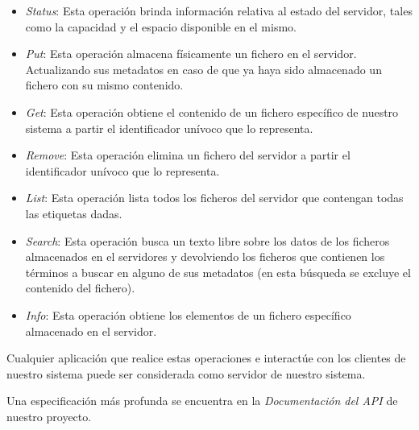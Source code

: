 \documentclass{article}
\begin{document}
\begin{itemize}
  \item \emph{Status}: Esta operación brinda información relativa al estado del
  servidor, tales como la capacidad y el espacio disponible en el mismo.
  \item \emph{Put}: Esta operación almacena físicamente un fichero en el 
  servidor. Actualizando sus metadatos en caso de que ya haya sido almacenado
  un fichero con su mismo contenido.
  \item \emph{Get}: Esta operación obtiene el contenido de un fichero específico
  de nuestro sistema a partir el identificador unívoco que lo representa.
  \item \emph{Remove}: Esta operación elimina un fichero del servidor a partir
  el identificador unívoco que lo representa.
  \item \emph{List}: Esta operación lista todos los ficheros del servidor que
  contengan todas las etiquetas dadas.
  \item \emph{Search}: Esta operación busca un texto libre sobre los datos
  de los ficheros almacenados en el servidores y devolviendo los ficheros que
  contienen los términos a buscar en alguno de sus metadatos (en esta búsqueda
  se excluye el contenido del fichero).
  \item \emph{Info}: Esta operación obtiene los elementos de un fichero
  específico almacenado en el servidor.
\end{itemize}

Cualquier aplicación que realice estas operaciones e interactúe con los
clientes de nuestro sistema puede ser considerada como servidor de nuestro
sistema.

Una especificación más profunda se encuentra en la \emph{Documentación del API}
de nuestro proyecto.
\end{document}
